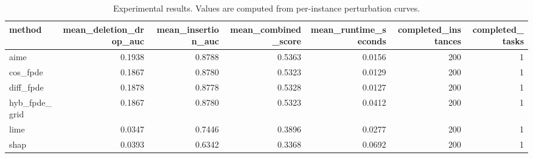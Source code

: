 \begin{table}[t]
\caption{Experimental results. Values are computed from per-instance perturbation curves.}
\label{tab:main_results_computed}
\centering
\begin{tabular}{lrrrrrr}
\toprule
method & mean\_deletion\_drop\_auc & mean\_insertion\_auc & mean\_combined\_score & mean\_runtime\_seconds & completed\_instances & completed\_tasks \\
\midrule
aime & 0.1938 & 0.8788 & 0.5363 & 0.0156 & 200 & 1 \\
cos\_fpde & 0.1867 & 0.8780 & 0.5323 & 0.0129 & 200 & 1 \\
diff\_fpde & 0.1878 & 0.8778 & 0.5328 & 0.0127 & 200 & 1 \\
hyb\_fpde\_grid & 0.1867 & 0.8780 & 0.5323 & 0.0412 & 200 & 1 \\
lime & 0.0347 & 0.7446 & 0.3896 & 0.0277 & 200 & 1 \\
shap & 0.0393 & 0.6342 & 0.3368 & 0.0692 & 200 & 1 \\
\bottomrule
\end{tabular}

\end{table}
